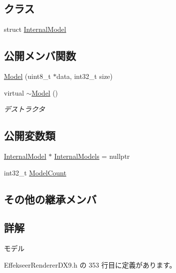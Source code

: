 \subsection*{クラス}
\begin{DoxyCompactItemize}
\item 
struct \mbox{\hyperlink{struct_effekseer_renderer_d_x9_1_1_model_1_1_internal_model}{Internal\+Model}}
\end{DoxyCompactItemize}
\subsection*{公開メンバ関数}
\begin{DoxyCompactItemize}
\item 
\mbox{\hyperlink{class_effekseer_renderer_d_x9_1_1_model_a2cc666c9789232bbe6bb09e5cf3fad6a}{Model}} (uint8\+\_\+t $\ast$data, int32\+\_\+t size)
\item 
virtual \mbox{\hyperlink{class_effekseer_renderer_d_x9_1_1_model_a5878dbe0a5971ffb28d6c1af347c6e87}{$\sim$\+Model}} ()
\begin{DoxyCompactList}\small\item\em デストラクタ \end{DoxyCompactList}\end{DoxyCompactItemize}
\subsection*{公開変数類}
\begin{DoxyCompactItemize}
\item 
\mbox{\hyperlink{struct_effekseer_renderer_d_x9_1_1_model_1_1_internal_model}{Internal\+Model}} $\ast$ \mbox{\hyperlink{class_effekseer_renderer_d_x9_1_1_model_a712d95cfe8c2223a708038c7132e60f5}{Internal\+Models}} = nullptr
\item 
int32\+\_\+t \mbox{\hyperlink{class_effekseer_renderer_d_x9_1_1_model_a993f041558265db631654723ca973e0a}{Model\+Count}}
\end{DoxyCompactItemize}
\subsection*{その他の継承メンバ}


\subsection{詳解}
モデル 

 Effekseer\+Renderer\+D\+X9.\+h の 353 行目に定義があります。



